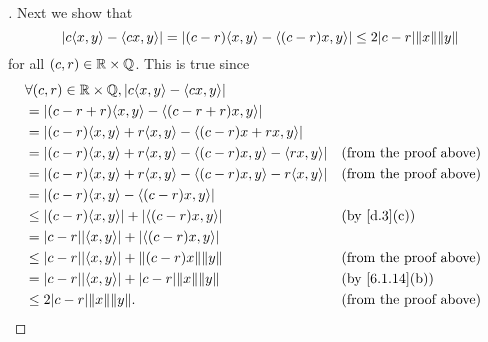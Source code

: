 \begin{proof}[]
  Next we show that
  \[
    \abs{c \inn{x, y} - \inn{cx, y}} = \abs{(c - r) \inn{x, y} - \inn{(c - r) x, y}} \leq 2 \abs{c - r} \norm{x} \norm{y}
  \]
  for all \((c, r) \in \mathbb{R} \times \mathbb{Q}\).
  This is true since
  \begin{align*}
     & \forall (c, r) \in \R \times \Q, \abs{c \inn{x, y} - \inn{cx, y}}                                               \\
     & = \abs{(c - r + r) \inn{x, y} - \inn{(c - r + r) x, y}}                                                         \\
     & = \abs{(c - r) \inn{x, y} + r \inn{x, y} - \inn{(c - r)x + rx, y}}                                              \\
     & = \abs{(c - r) \inn{x, y} + r \inn{x, y} - \inn{(c - r)x, y} - \inn{rx, y}}  &  & \text{(from the proof above)} \\
     & = \abs{(c - r) \inn{x, y} + r \inn{x, y} - \inn{(c - r)x, y} - r \inn{x, y}} &  & \text{(from the proof above)} \\
     & = \abs{(c - r) \inn{x, y} - \inn{(c - r) x, y}}                                                                 \\
     & \leq \abs{(c - r) \inn{x, y}} + \abs{\inn{(c - r) x, y}}                     &  & \by{d.3}[c]                   \\
     & = \abs{c - r} \abs{\inn{x, y}} + \abs{\inn{(c - r) x, y}}                                                       \\
     & \leq \abs{c - r} \abs{\inn{x, y}} + \norm{(c - r) x} \norm{y}                &  & \text{(from the proof above)} \\
     & = \abs{c - r} \abs{\inn{x, y}} + \abs{c - r} \norm{x} \norm{y}               &  & \by{6.1.14}[b]                \\
     & \leq 2 \abs{c - r} \norm{x} \norm{y}.                                        &  & \text{(from the proof above)}
  \end{align*}


\end{proof}
